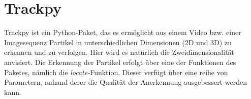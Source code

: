 \section{Trackpy \label{kap1_trackpy}}
Trackpy ist ein Python-Paket, das es ermöglicht aus einem Video bzw. einer Imagesequenz Partikel in unterschiedlichen Dimensionen (2D und 3D) zu erkennen und zu verfolgen. Hier wird es natürlich die Zweidimensionalität anvisiert. Die Erkennung der Partikel erfolgt über eine der Funktionen des Paketes, nämlich die \textit{locate-}Funktion.
Dieser verfügt über eine reihe von Parametern, anhand derer die Qualität der Anerkennung ausgebessert werden kann.

